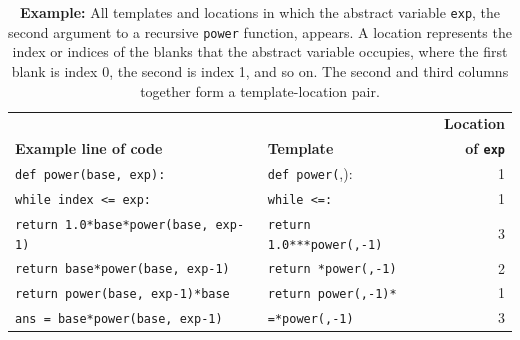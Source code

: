 \begin{table}
\centering
\caption*{\textbf{Example:} All templates and locations in which the abstract variable \texttt{exp}, the second argument to a recursive \texttt{power} function, appears. A location represents the index or indices of the blanks that the abstract variable occupies, where the first blank is index 0, the second is index 1, and so on. The second and third columns together form a template-location pair.} %
\begin{tabular}{l l r}
 &  & {\bf Location} \\
{\bf Example line of code} & {\bf Template} & {\bf of \texttt{exp}} \\
\hline
\footnotesize{\texttt{def power(base, exp):}} & \footnotesize{\texttt{def power(\underline{\hspace{1em}}},\underline{\hspace{1em}}):} & 1 \\
\footnotesize{\texttt{while index <= exp:}} & \footnotesize{\texttt{while \underline{\hspace{1em}}<=\underline{\hspace{1em}}:}} & 1 \\
\footnotesize{\texttt{return 1.0*base*power(base, exp-1)}} & \footnotesize{\texttt{return 1.0*\underline{\hspace{1em}}*\underline{\hspace{1em}}*power(\underline{\hspace{1em}},\underline{\hspace{1em}}-1)}} & 3 \\
\footnotesize{\texttt{return base*power(base, exp-1)}} & \footnotesize{\texttt{return \underline{\hspace{1em}}*power(\underline{\hspace{1em}},\underline{\hspace{1em}}-1)}} & 2 \\
\footnotesize{\texttt{return power(base, exp-1)*base}} & \footnotesize{\texttt{return power(\underline{\hspace{1em}},\underline{\hspace{1em}}-1)*\underline{\hspace{1em}}}} & 1 \\
\footnotesize{\texttt{ans = base*power(base, exp-1)}} & \footnotesize{\texttt{\underline{\hspace{1em}}=\underline{\hspace{1em}}*power(\underline{\hspace{1em}},\underline{\hspace{1em}}-1)}} & 3 \\

\end{tabular}
\end{table}
